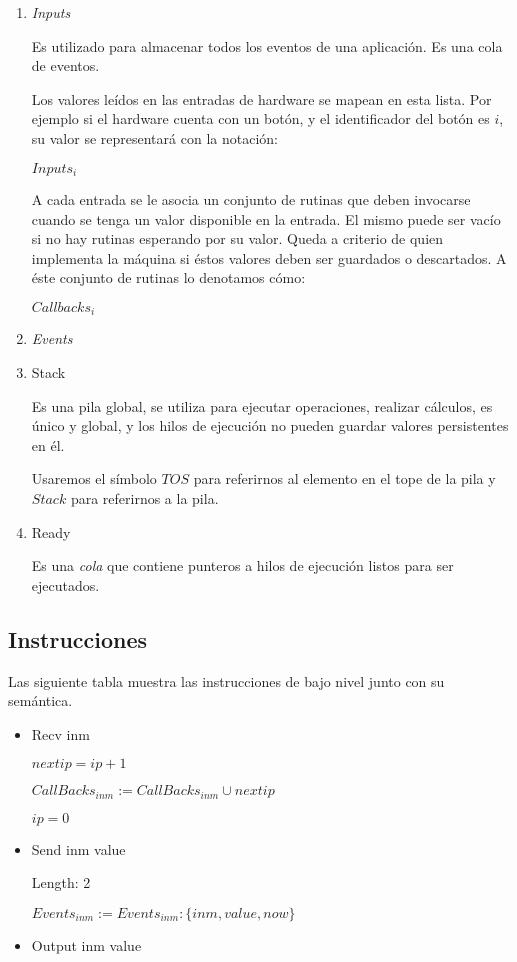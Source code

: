 \begin{enumerate}

\item \emph{Inputs}

  
  Es utilizado para almacenar todos los eventos de una aplicación.
  Es una cola de eventos.

  

  Los valores leídos en las entradas de hardware se mapean
en esta lista. Por ejemplo si el hardware cuenta con un botón,
y el identificador del botón es $i$,
su valor se representará con la notación:

  $Inputs_i$

  A cada entrada se le asocia un conjunto de
rutinas que deben invocarse cuando se tenga un
valor disponible en la entrada. El mismo puede ser vacío si
no hay rutinas esperando por su valor. Queda a criterio de quien
implementa la máquina si éstos valores deben ser guardados o
descartados. 
  A éste conjunto de rutinas lo denotamos cómo:

  $Callbacks_i$

\item \emph{Events}


\item Stack

Es una pila global, se utiliza para ejecutar operaciones,
realizar cálculos, es único
y global, y los hilos de ejecución no pueden guardar valores
persistentes en él.

Usaremos el símbolo $TOS$ para referirnos al elemento en el tope
de la pila y $Stack$ para referirnos a la pila.

\item Ready

Es una \emph{cola} que contiene punteros a hilos de ejecución
listos para ser ejecutados.

\end{enumerate}

\subsection{Instrucciones}

Las siguiente tabla muestra las instrucciones de bajo nivel junto con su semántica.

\begin{itemize}
\item Recv inm

 $nextip = ip + 1$

 $CallBacks_{inm} := CallBacks_{inm} \cup nextip$
 
 $ip = 0$

\item Send inm value

 Length: 2

 $Events_{inm} := Events_{inm} : \{inm, value, now\}$

\item Output inm value
\end{itemize}

